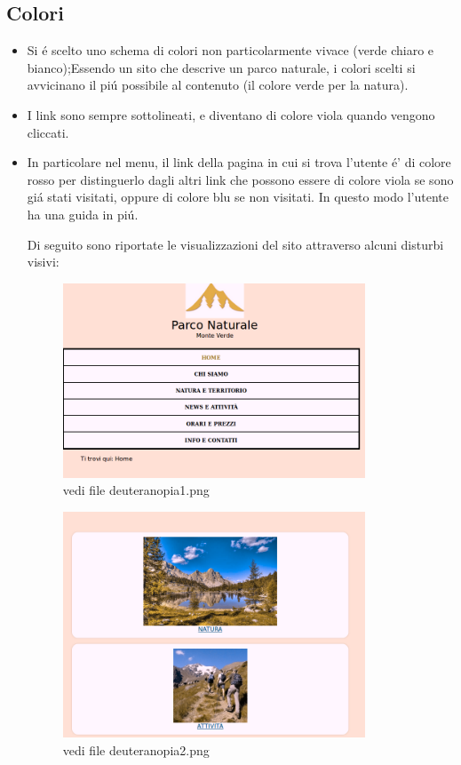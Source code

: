 \documentclass[12pt]{article}
\begin{document}
			\subsection{Colori}
			\begin{itemize}
				\item Si \'e scelto uno schema di colori non particolarmente vivace (verde chiaro e bianco);Essendo un sito che descrive un parco naturale, i colori scelti si avvicinano il pi\'u possibile al contenuto (il colore verde per la natura).

				\item I link sono sempre sottolineati, e diventano di colore viola quando vengono cliccati.
				\item In particolare nel menu, il link della pagina in cui si trova l'utente \'e' di colore rosso per distinguerlo dagli altri link che possono essere di colore viola se sono gi\'a stati visitati, oppure di colore blu se non visitati.
				In questo modo l'utente ha una guida in pi\'u.

			Di seguito sono riportate le visualizzazioni del sito attraverso alcuni disturbi visivi:

			\begin{figure}
			\centering
			\includegraphics[width=90mm]{deuteranopia1}
			\caption{vedi file deuteranopia1.png}
			\end{figure} 

			\begin{figure}
			\centering
			\includegraphics[width=90mm]{deuteranopia2}
			\caption{vedi file deuteranopia2.png}
			\end{figure}


\end{itemize}
\end{document}
